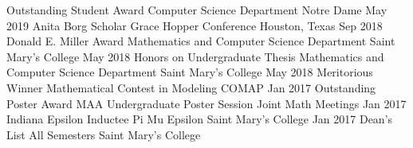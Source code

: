 \begin{cvhonors}
  \cvhonor
    {Outstanding Student Award}
    {Computer Science Department}
    {Notre Dame}
    {May 2019}
  \cvhonor
    {Anita Borg Scholar}
    {Grace Hopper Conference}
    {Houston, Texas}
    {Sep 2018}
  \cvhonor
    {Donald E. Miller Award}
    {Mathematics and Computer Science Department}
    {Saint Mary's College}
    {May 2018}
  \cvhonor
    {Honors on Undergraduate Thesis}
    {Mathematics and Computer Science Department}
    {Saint Mary's College}
    {May 2018}
  \cvhonor
    {Meritorious Winner}
    {Mathematical Contest in Modeling}
    {COMAP}
    {Jan 2017}
  \cvhonor
    {Outstanding Poster Award}
    {MAA Undergraduate Poster Session}
    {Joint Math Meetings}
    {Jan 2017}
  \cvhonor
    {Indiana Epsilon Inductee}
    {Pi Mu Epsilon}
    {Saint Mary's College}
    {Jan 2017}
  \cvhonor
    {Dean's List}
    {All Semesters}
    {Saint Mary's College}
    {}
\end{cvhonors}
